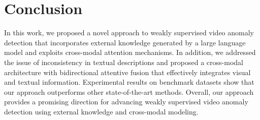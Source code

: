 \section{Conclusion}
\label{sec:conc}

In this work, we proposed a novel approach to weakly supervised video anomaly detection that incorporates external knowledge generated by a large language model and exploits cross-modal attention mechanisms. In addition, we addressed the issue of inconsistency in textual descriptions and proposed a cross-modal architecture with bidirectional attentive fusion that effectively integrates visual and textual information. Experimental results on benchmark datasets show that our approach outperforms other state-of-the-art methods. Overall, our approach provides a promising direction for advancing weakly supervised video anomaly detection using external knowledge and cross-modal modeling.
